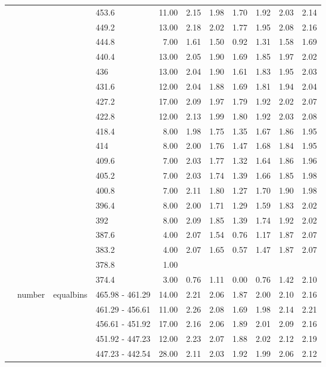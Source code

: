 \begin{longtable}{llllrrrrrrr}
   &  &  & 453.6 & 11.00 & 2.15 & 1.98 & 1.70 & 1.92 & 2.03 & 2.14 \\ 
   &  &  & 449.2 & 13.00 & 2.18 & 2.02 & 1.77 & 1.95 & 2.08 & 2.16 \\ 
   &  &  & 444.8 & 7.00 & 1.61 & 1.50 & 0.92 & 1.31 & 1.58 & 1.69 \\ 
   &  &  & 440.4 & 13.00 & 2.05 & 1.90 & 1.69 & 1.85 & 1.97 & 2.02 \\ 
   &  &  & 436 & 13.00 & 2.04 & 1.90 & 1.61 & 1.83 & 1.95 & 2.03 \\ 
   &  &  & 431.6 & 12.00 & 2.04 & 1.88 & 1.69 & 1.81 & 1.94 & 2.04 \\ 
   &  &  & 427.2 & 17.00 & 2.09 & 1.97 & 1.79 & 1.92 & 2.02 & 2.07 \\ 
   &  &  & 422.8 & 12.00 & 2.13 & 1.99 & 1.80 & 1.92 & 2.03 & 2.08 \\ 
   &  &  & 418.4 & 8.00 & 1.98 & 1.75 & 1.35 & 1.67 & 1.86 & 1.95 \\ 
   &  &  & 414 & 8.00 & 2.00 & 1.76 & 1.47 & 1.68 & 1.84 & 1.95 \\ 
   &  &  & 409.6 & 7.00 & 2.03 & 1.77 & 1.32 & 1.64 & 1.86 & 1.96 \\ 
   &  &  & 405.2 & 7.00 & 2.03 & 1.74 & 1.39 & 1.66 & 1.85 & 1.98 \\ 
   &  &  & 400.8 & 7.00 & 2.11 & 1.80 & 1.27 & 1.70 & 1.90 & 1.98 \\ 
   &  &  & 396.4 & 8.00 & 2.00 & 1.71 & 1.29 & 1.59 & 1.83 & 2.02 \\ 
   &  &  & 392 & 8.00 & 2.09 & 1.85 & 1.39 & 1.74 & 1.92 & 2.02 \\ 
   &  &  & 387.6 & 4.00 & 2.07 & 1.54 & 0.76 & 1.17 & 1.87 & 2.07 \\ 
   &  &  & 383.2 & 4.00 & 2.07 & 1.65 & 0.57 & 1.47 & 1.87 & 2.07 \\ 
   &  &  & 378.8 & 1.00 &  &  &  &  &  &  \\ 
   &  &  & 374.4 & 3.00 & 0.76 & 1.11 & 0.00 & 0.76 & 1.42 & 2.10 \\ 
   & number & equalbins & 465.98 - 461.29 & 14.00 & 2.21 & 2.06 & 1.87 & 2.00 & 2.10 & 2.16 \\ 
   &  &  & 461.29 - 456.61 & 11.00 & 2.26 & 2.08 & 1.69 & 1.98 & 2.14 & 2.21 \\ 
   &  &  & 456.61 - 451.92 & 17.00 & 2.16 & 2.06 & 1.89 & 2.01 & 2.09 & 2.16 \\ 
   &  &  & 451.92 - 447.23 & 12.00 & 2.23 & 2.07 & 1.88 & 2.02 & 2.12 & 2.19 \\ 
   &  &  & 447.23 - 442.54 & 28.00 & 2.11 & 2.03 & 1.92 & 1.99 & 2.06 & 2.12 \\ 

\end{longtable}
